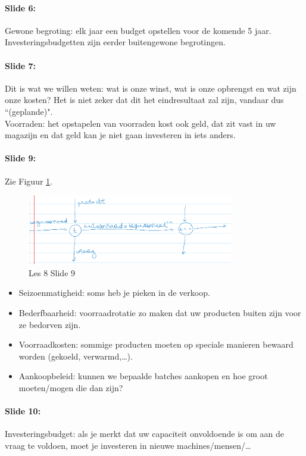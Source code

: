\documentclass[10pt,a4paper]{report}
\begin{document}
\paragraph{Slide 6:} Gewone begroting: elk jaar een budget opstellen voor de komende 5 jaar. Investeringsbudgetten zijn eerder buitengewone begrotingen. 

\paragraph{Slide 7:} Dit is wat we willen weten: wat is onze winst, wat is onze opbrengst en wat zijn onze kosten? Het is niet zeker dat dit het eindresultaat zal zijn, vandaar dus ``(geplande)".\\
Voorraden: het opstapelen van voorraden kost ook geld, dat zit vast in uw magazijn en dat geld kan je niet gaan investeren in iets anders.

\paragraph{Slide 9:} Zie Figuur \ref{les08_01}.

\begin{figure}[h!]
\centering
\includegraphics[width=90mm]{Les08_01.png}
\caption{Les 8 Slide 9} 
\label{les08_01}
\end{figure}

\begin{itemize}
\item Seizoenmatigheid: soms heb je pieken in de verkoop.
\item Bederfbaarheid: voorraadrotatie zo maken dat uw producten buiten zijn voor ze bedorven zijn.
\item Voorraadkosten: sommige producten moeten op speciale manieren bewaard worden (gekoeld, verwarmd,…).
\item Aankoopbeleid: kunnen we bepaalde batches aankopen en hoe groot moeten/mogen die dan zijn?
\end{itemize}

\paragraph{Slide 10:} Investeringsbudget: als je merkt dat uw capaciteit onvoldoende is om aan de vraag te voldoen, moet je investeren in nieuwe machines/mensen/… 
\end{document}

